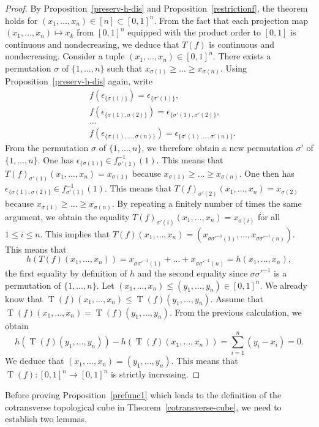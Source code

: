 \documentclass[a4paper,12pt]{amsart}
\newcommand{\bpf}{\begin{proof}}
\newcommand{\epf}{\end{proof}}
\theoremstyle{definition}
\renewcommand{\leq}{\leqslant}
\renewcommand{\geq}{\geqslant}
\DeclareMathOperator{\TT}{T}
\begin{document}
\bpf By Proposition~\ref{preserv-h-dis} and Proposition~\ref{restrictionf}, the theorem holds for $(x_1,\dots,x_n)\in [n] \subset [0,1]^n$. From the fact that each projection map $(x_1,\dots,x_n)\mapsto x_k$ from $[0,1]^n$ equipped with the product order to $[0,1]$ is continuous and nondecreasing, we deduce that $T(f)$ is continuous and nondecreasing. Consider a tuple $(x_1,\dots,x_n) \in [0,1]^n$. There exists a permutation $\sigma$ of $\{1,\dots,n\}$ such that $x_{\sigma(1)}\geq\dots\geq x_{\sigma(n)}$. Using Proposition~\ref{preserv-h-dis} again, write 
\begin{align*}
	& f(\epsilon_{\{\sigma(1)\}}) = \epsilon_{\{\sigma'(1)\}},\\
	& f(\epsilon_{\{\sigma(1),\sigma(2)\}}) = \epsilon_{\{\sigma'(1),\sigma'(2)\}},\\
	&\dots \\
	& f(\epsilon_{\{\sigma(1),\dots,\sigma(n)\}}) = \epsilon_{\{\sigma'(1),\dots,\sigma'(n)\}}.
\end{align*}
From the permutation $\sigma$ of $\{1,\dots,n\}$, we therefore obtain a new permutation $\sigma'$ of $\{1,\dots,n\}$. One has $\epsilon_{\{\sigma(1)\}} \in f^{-1}_{\sigma'(1)}(1)$. This means that $T(f)_{\sigma'(1)}(x_1,\dots,x_n)=x_{\sigma(1)}$ because $x_{\sigma(1)}\geq\dots \geq x_{\sigma(n)}$. One then has $\epsilon_{\{\sigma(1),\sigma(2)\}} \in f^{-1}_{\sigma'(1)}(1)$. This means that $T(f)_{\sigma'(2)}(x_1,\dots,x_n)=x_{\sigma(2)}$ because $x_{\sigma(1)}\geq\dots \geq x_{\sigma(n)}$. By repeating a finitely number of times the same argument, we obtain the equality $T(f)_{\sigma'(i)}(x_1,\dots,x_n)=x_{\sigma(i)}$ for all $1\leq i\leq n$. This implies that $T(f)(x_1,\dots,x_n)=(x_{\sigma\sigma'^{-1}(1)},\dots,x_{\sigma\sigma'^{-1}(n)})$. This means that \[h(T(f)(x_1,\dots,x_n)) = x_{\sigma\sigma'^{-1}(1)}+\dots+x_{\sigma\sigma'^{-1}(n)} = h(x_1,\dots,x_n),\] 
the first equality by definition of $h$ and the second equality since $\sigma\sigma'^{-1}$ is a permutation of $\{1,\dots,n\}$. Let $(x_1,\dots,x_n)\leq(y_1,\dots,y_n)\in [0,1]^n$. We already know that $\TT(f)(x_1,\dots,x_n) \leq \TT(f)(y_1,\dots,y_n)$. Assume that $\TT(f)(x_1,\dots,x_n) = \TT(f)(y_1,\dots,y_n)$. From the previous calculation, we obtain \[h(\TT(f)(y_1,\dots,y_n)) - h(\TT(f)(x_1,\dots,x_n)) = \sum_{i=1}^{n}(y_i-x_i) =0.\] We deduce that $(x_1,\dots,x_n)=(y_1,\dots,y_n)$. This means that $\TT(f):[0,1]^n\longrightarrow [0,1]^n$ is strictly increasing. 
\epf


Before proving Proposition~\ref{prefunc1} which leads to the definition of the cotransverse topological cube in Theorem~\ref{cotransverse-cube}, we need to establish two lemmas.
\end{document}
